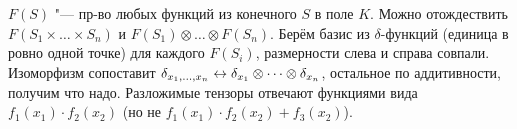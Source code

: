 \section{} %
$F(S)$ "--- пр-во любых функций из конечного $S$ в поле $K$.
Можно отождествить $F(S_1 \times \dots \times S_n)$ и $F(S_1) \otimes \dots \otimes F(S_n)$.
Берём базис из $\delta$-функций (единица в ровно одной точке) для каждого $F(S_i)$, размерности слева и справа совпали.
Изоморфизм сопоставит $\delta_{x_1, \dots, x_n} \leftrightarrow \delta_{x_1} \otimes \dots \otimes \delta_{x_n}$,
остальное по аддитивности, получим что надо.
Разложимые тензоры отвечают функциями вида $f_1(x_1) \cdot f_2(x_2)$ (но не $f_1(x_1)\cdot f_2(x_2) + f_3(x_2)$).

\section{} %

\section{} %

\section{} %

\section{} %

\section{} %

